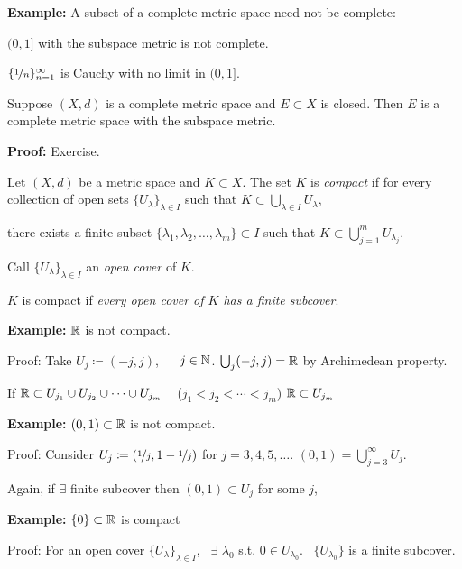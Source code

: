 \documentclass[10pt,aspectratio=149]{beamer}
\begin{document}
\begin{frame}

\textbf{Example:}
A subset of a complete metric space need not be complete:

\pause
$(0,1]$ with the subspace metric is not complete.

\pause
$\{ \nicefrac{1}{n} \}_{n=1}^\infty$ is Cauchy
with no limit in $(0,1]$.

\pause
\begin{proposition}
Suppose $(X,d)$ is a complete metric space and $E \subset X$
is closed.
\pause
Then $E$ is a complete metric space with the subspace metric.
\end{proposition}

\pause
\textbf{Proof:} Exercise.

\end{frame}

\begin{frame}

\begin{definition}
Let $(X,d)$ be a metric space and $K \subset X$. 
\pause
The set $K$ is \emph{compact}
if for every collection
of open sets $\{ U_{\lambda} \}_{\lambda \in I}$ such that
\quad
$\displaystyle
K \subset \bigcup_{\lambda \in I} U_\lambda$,

\pause
there exists a finite subset
$\{ \lambda_1, \lambda_2,\ldots,\lambda_m \} \subset I$
such that
\quad
$\displaystyle
K \subset \bigcup_{j=1}^m U_{\lambda_j}$.
\end{definition}

\pause
Call $\{ U_{\lambda} \}_{\lambda \in I}$ an \emph{open cover} of $K$.


\pause
$K$ is compact if \emph{every open cover of $K$ has a finite subcover}.

\pause
\medskip

\textbf{Example:}
${\mathbb{R}}$ is not compact.

\pause
Proof: Take $U_j \coloneqq (-j,j)$, ~~ $j \in {\mathbb{N}}$.
\pause
\quad
$\bigcup_j (-j,j) = {\mathbb{R}}$ by Archimedean property.

\pause
If ${\mathbb{R}} \subset U_{j_1} \cup U_{j_2} \cup \cdots \cup U_{j_m}$ ~
($j_1 < j_2 < \cdots < j_m$) \wthus ${\mathbb{R}} \subset U_{j_m}$
\pause
\quad
\contradiction

\pause
\medskip

\textbf{Example:}
$(0,1) \subset {\mathbb{R}}$ is not compact.

\pause
Proof:  Consider $U_{j} \coloneqq (\nicefrac{1}{j},1-\nicefrac{1}{j})$ for $j=3,4,5,\ldots$.
\pause
\quad
$(0,1) = \bigcup_{j=3}^\infty U_j$.

\pause
Again, if $\exists$ finite subcover then $(0,1) \subset U_j$ for some
$j$,
\pause
\qquad \contradiction

\pause
\medskip

\textbf{Example:}
$\{ 0 \} \subset {\mathbb{R}}$ is compact

\pause
Proof: For an open cover $\{ U_{\lambda} \}_{\lambda \in I}$,
\pause
~$\exists$ $\lambda_0$ s.t. $0 \in U_{\lambda_0}$.
\pause
~$\{ U_{\lambda_0} \}$ is a finite subcover.

\end{frame}
\end{document}
